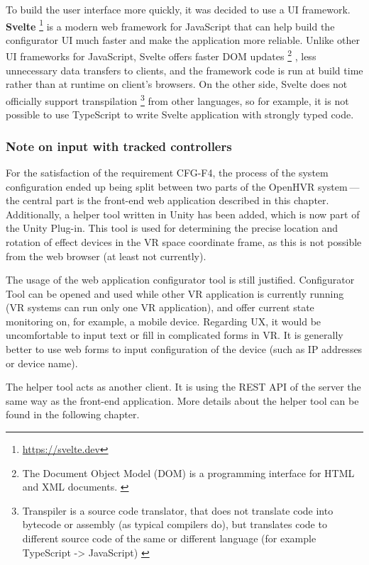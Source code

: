 To build the user interface more quickly, it was decided to use a UI framework.
\textbf{Svelte} \footnote{\href{https://svelte.dev}{https://svelte.dev}} is a modern web framework for JavaScript
that can help build the configurator UI much faster and make the application
more reliable. Unlike other UI frameworks for JavaScript, Svelte offers
faster DOM updates
\footnote{The Document Object Model (DOM) is a programming interface for HTML and XML documents. \hyperlink{dom}{}}
, less unnecessary data transfers
to clients, and the framework code is run at build time rather than at runtime on
client’s browsers. \hyperlink{svelteblog}{} On the other side, Svelte does not officially
support transpilation
\footnote{Transpiler is a source code translator, that does not translate code into bytecode or assembly (as typical compilers do), but translates code to different source code of the same or different language (for example TypeScript -> JavaScript) \hyperlink{sscd}{}}
from other languages, so for example, it is not possible
to use TypeScript to write Svelte application with strongly typed code.


\hypertarget{x-note-on-input-with-tracked-controllers}{\subsubsection*{Note on input with tracked controllers}}
For the satisfaction of the requirement CFG-F4, the process of the system configuration
ended up being split between two parts of the OpenHVR system — the central part is the front-end web application described
in this chapter. Additionally, a helper tool written in Unity has been added,
which is now part of the Unity Plug-in. This tool is used for determining
the precise location and rotation of effect devices in the VR space
coordinate frame, as this is not possible from the web browser (at least
not currently).


The usage of the web application configurator tool is still justified.
Configurator Tool can be opened and used while other VR application is currently
running (VR systems can run only one VR application), and offer current state
monitoring on, for example, a mobile device. Regarding UX, it would be uncomfortable to
input text or fill in complicated forms in VR. It is generally better to use web forms to
input configuration of the device (such as IP addresses or device name).


The helper tool acts as another client. It is using the REST API of the server
the same way as the front-end application. More details about the helper tool
can be found in the following chapter.


